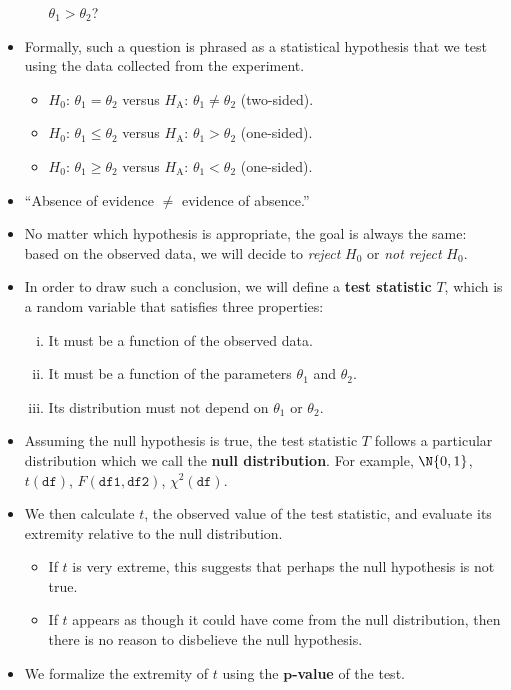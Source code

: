 \begin{itemize}
\begin{itemize}
                        $ \theta_1>\theta_2 $?
            \end{itemize}
      \item Formally, such a question is phrased as a statistical hypothesis that we test using
            the data collected from the experiment.
            \begin{itemize}
                  \item $ H_0 $: $ \theta_1=\theta_2 $ versus $ H_\text{A} $: $ \theta_1\ne\theta_2 $ (two-sided).
                  \item $ H_0 $: $ \theta_1\le\theta_2 $ versus $ H_\text{A} $: $ \theta_1>\theta_2 $ (one-sided).
                  \item $ H_0 $: $ \theta_1\ge\theta_2 $ versus $ H_\text{A} $: $ \theta_1<\theta_2 $ (one-sided).
            \end{itemize}
      \item ``Absence of evidence $ \ne  $ evidence of absence.''
      \item No matter which hypothesis is appropriate, the goal is always the same: based on the
            observed data, we will decide to \emph{reject} $ H_0 $ or \emph{not reject} $ H_0 $.
      \item In order to draw such a conclusion, we will define a \textbf{test statistic} $ T $,
            which is a random variable that satisfies three properties:
            \begin{enumerate}[(i)]
                  \item It must be a function of the observed data.
                  \item It must be a function of the parameters $ \theta_1 $ and $ \theta_2 $.
                  \item Its distribution must not depend on $ \theta_1 $ or $ \theta_2 $.
            \end{enumerate}
      \item Assuming the null hypothesis is true, the test statistic $ T $ follows
            a particular distribution which we call the \textbf{null distribution}.
            For example, $ \N{0,1} $, $ t(\texttt{df}) $,
            $ F(\texttt{df1}, \texttt{df2}) $, $ \chi^2(\texttt{df}) $.
      \item We then calculate $ t $, the observed value of the test statistic, and evaluate its extremity
            relative to the null distribution.
            \begin{itemize}
                  \item If $ t $ is very extreme, this suggests that perhaps the null hypothesis
                        is not true.
                  \item If $ t $ appears as though it could have come from the null distribution, then
                        there is no reason to disbelieve the null hypothesis.
            \end{itemize}
      \item We formalize the extremity of $ t $ using the \textbf{$ \symbf{p} $-value} of the test.


\end{itemize}
